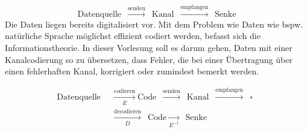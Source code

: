 \documentclass{cheat-sheet}
\begin{document}



\[
  \text{Datenquelle} \enspace
  \xrightarrow{\text{senden}} \enspace
  \text{Kanal} \enspace
  \xrightarrow{\text{empfangen}} \enspace
  \text{Senke}
\]
Die Daten liegen bereits digitalisiert vor.
Mit dem Problem wie Daten wie bspw. natürliche Sprache möglichst effizient codiert werden, befasst sich die Informationstheorie.
In dieser Vorlesung soll es darum gehen, Daten mit einer Kanalcodierung so zu übersetzen, dass Fehler, die bei einer Übertragung über einen fehlerhaften Kanal, korrigiert oder zumindest bemerkt werden.

%


\begin{align*}
  \text{Datenquelle} \enspace
  & \xrightarrow[E]{\text{codieren}}
  \text{Code} \enspace
  \xrightarrow{\text{senden}} \enspace
  \text{Kanal} \enspace
  \xrightarrow{\text{empfangen}} \enspace
  \square \enspace \\
  & \xrightarrow[D]{\text{decodieren}} \enspace
  \text{Code}
  \xrightarrow[E^{-1}]{} \enspace
  \text{Senke}
\end{align*}









\end{document}
